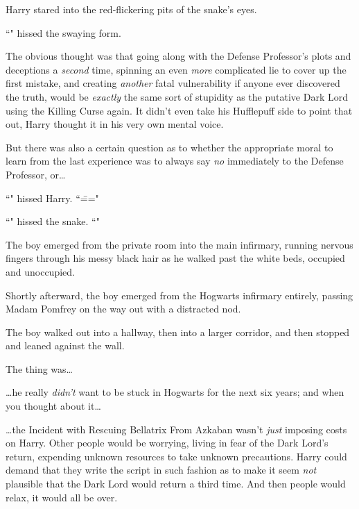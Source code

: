 Harry stared into the red-flickering pits of the snake's eyes.

``" hissed the swaying form.

The obvious thought was that going along with the Defense Professor's plots and deceptions a \emph{second} time, spinning an even \emph{more} complicated lie to cover up the first mistake, and creating \emph{another} fatal vulnerability if anyone ever discovered the truth, would be \emph{exactly} the same sort of stupidity as the putative Dark Lord using the Killing Curse again. It didn't even take his Hufflepuff side to point that out, Harry thought it in his very own mental voice.

But there was also a certain question as to whether the appropriate moral to learn from the last experience was to always say \emph{no} immediately to the Defense Professor, or{\ldots}

``" hissed Harry. ``\==="

``" hissed the snake. ``"

\later

The boy emerged from the private room into the main infirmary, running nervous fingers through his messy black hair as he walked past the white beds, occupied and unoccupied.

Shortly afterward, the boy emerged from the Hogwarts infirmary entirely, passing Madam Pomfrey on the way out with a distracted nod.

The boy walked out into a hallway, then into a larger corridor, and then stopped and leaned against the wall.

The thing was{\ldots}

{\ldots}he really \emph{didn't} want to be stuck in Hogwarts for the next six years; and when you thought about it{\ldots}

{\ldots}the Incident with Rescuing Bellatrix From Azkaban wasn't \emph{just} imposing costs on Harry. Other people would be worrying, living in fear of the Dark Lord's return, expending unknown resources to take unknown precautions. Harry could demand that they write the script in such fashion as to make it seem \emph{not} plausible that the Dark Lord would return a third time. And then people would relax, it would all be over.

